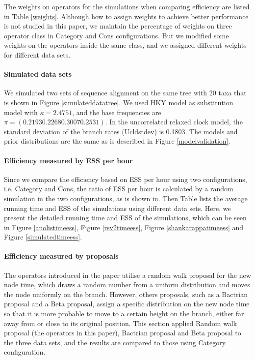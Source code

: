 \documentclass{bmcart}
\begin{document}
\begin{backmatter}
The weights on operators for the simulations when comparing efficiency are listed in Table \ref{weights}. Although how to assign weights to achieve better performance is not studied in this paper, we maintain the percentage of weights on three operator class in Category and Cons configurations. But we modified some weights on the operators inside the same class, and we assigned different weights for different data sets.

\paragraph*{Simulated data sets}
We simulated two sets of sequence alignment on the same tree with 20 taxa that is shown in Figure \ref{simulateddatatree}. We used HKY model as substitution model with $\kappa = 2.4751$, and the base frequencies are $\pi = (0.2193 0.2268 0.3007 0.2531)$. In the uncorrelated relaxed clock model, the standard deviation of the branch rates (Ucldstdev) is 0.1803. The models and prior distributions are the same as is described in Figure \ref{modelvalidation}.

\paragraph*{Efficiency measured by ESS per hour}

Since we compare the efficiency based on ESS per hour using two configurations, i.e. Category and Cons, the ratio of ESS per hour is calculated by a random simulation in the two configurations, as is shown in. Then Table lists the average running time and ESS of the simulations using different data sets. Here, we present the detailed running time and ESS of the simulations, which can be seen in Figure \ref{anolistimeess}, Figure \ref{rsv2timeess}, Figure \ref{shankarappatimeess} and Figure \ref{simulatedtimeess}.

\paragraph*{Efficiency measured by proposals}

The operators introduced in the paper utilise a random walk proposal for the new node time, which draws a random number from a uniform distribution and moves the node uniformly on the branch. However, others proposals, such as a Bactrian proposal and a Beta proposal, assign a specific distribution on the new node time so that it is more probable to move to a certain height on the branch, either far away from or close to its original position. This section applied Random walk proposal (the operators in this paper), Bactrian proposal and Beta proposal to the three data sets, and the results are compared to those using Category configuration.


\end{backmatter}
\end{document}
